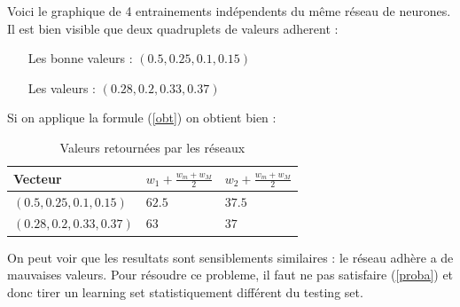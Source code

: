 Voici le graphique de 4 entrainements indépendents du même réseau de neurones.
Il est bien visible que deux quadruplets de valeurs adherent :
\begin{itemize}
    \item[Les bonne valeurs :] $(0.5, 0.25, 0.1, 0.15)$
    \item[Les valeurs :] $(0.28, 0.2, 0.33, 0.37)$
\end{itemize}
Si on applique la formule (\ref{obt}) on obtient bien :
\begin{table}[H]
    \centering
    \begin{tabular}{|l|l|l|}
        \hline
        Vecteur & $w_1 + \frac{w_m + w_M}{2}$ & $w_2 + \frac{w_m + w_M}{2}$ \\ \hline \hline
        $(0.5, 0.25, 0.1, 0.15)$  & $62.5$ & $37.5$ \\ \hline
        $(0.28, 0.2, 0.33, 0.37)$ &  $63$  &  $37$  \\ \hline
    \end{tabular}
    \label{pb_tab}
    \caption{Valeurs retournées par les réseaux}
\end{table}
On peut voir que les resultats sont sensiblements similaires : le réseau adhère a de mauvaises valeurs.
Pour résoudre ce probleme, il faut ne pas satisfaire (\ref{proba}) et donc tirer un learning set statistiquement différent du testing set.
